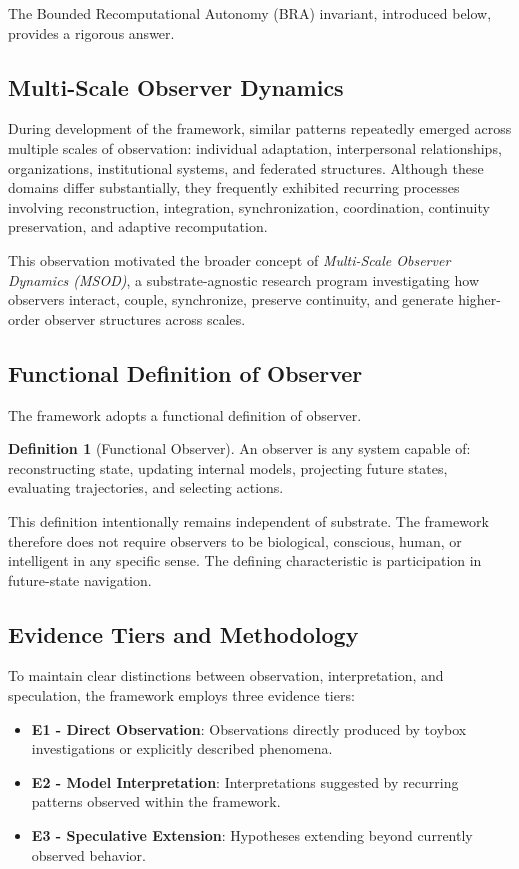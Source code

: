 \documentclass[12pt]{article}
\theoremstyle{plain}
\theoremstyle{definition}
\newtheorem{definition}[theorem]{Definition}
\theoremstyle{remark}
\begin{document}
The Bounded Recomputational Autonomy (BRA) invariant, introduced below, provides a rigorous answer.

\subsection{Multi-Scale Observer Dynamics}

During development of the framework, similar patterns repeatedly emerged across multiple scales of observation: individual adaptation, interpersonal relationships, organizations, institutional systems, and federated structures. Although these domains differ substantially, they frequently exhibited recurring processes involving reconstruction, integration, synchronization, coordination, continuity preservation, and adaptive recomputation.

This observation motivated the broader concept of \emph{Multi-Scale Observer Dynamics (MSOD)}, a substrate-agnostic research program investigating how observers interact, couple, synchronize, preserve continuity, and generate higher-order observer structures across scales.

\subsection{Functional Definition of Observer}

The framework adopts a functional definition of observer.

\begin{definition}[Functional Observer]
\statusdef
An observer is any system capable of: reconstructing state, updating internal models, projecting future states, evaluating trajectories, and selecting actions.
\end{definition}

This definition intentionally remains independent of substrate. The framework therefore does not require observers to be biological, conscious, human, or intelligent in any specific sense. The defining characteristic is participation in future-state navigation.

\subsection{Evidence Tiers and Methodology}

To maintain clear distinctions between observation, interpretation, and speculation, the framework employs three evidence tiers:

\begin{itemize}
    \item \textbf{E1 - Direct Observation}: Observations directly produced by toybox investigations or explicitly described phenomena.
    \item \textbf{E2 - Model Interpretation}: Interpretations suggested by recurring patterns observed within the framework.
    \item \textbf{E3 - Speculative Extension}: Hypotheses extending beyond currently observed behavior.
\end{itemize}
\end{document}
